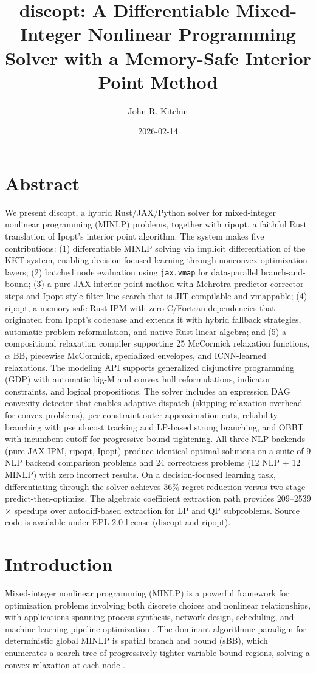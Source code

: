 \documentclass[12pt,preprint]{article}
\title{discopt: A Differentiable Mixed-Integer Nonlinear Programming Solver with a Memory-Safe Interior Point Method}
\author{John R. Kitchin}
\date{2026-02-14}
\begin{document}
\maketitle

\section{Abstract}
\label{org-abstract}
We present discopt, a hybrid Rust/JAX/Python solver for mixed-integer nonlinear programming (MINLP) problems, together with ripopt, a faithful Rust translation of Ipopt's interior point algorithm. The system makes five contributions: (1) differentiable MINLP solving via implicit differentiation of the KKT system, enabling decision-focused learning through nonconvex optimization layers; (2) batched node evaluation using \texttt{jax.vmap} for data-parallel branch-and-bound; (3) a pure-JAX interior point method with Mehrotra predictor-corrector steps and Ipopt-style filter line search that is JIT-compilable and vmappable; (4) ripopt, a memory-safe Rust IPM with zero C/Fortran dependencies that originated from Ipopt's codebase and extends it with hybrid fallback strategies, automatic problem reformulation, and native Rust linear algebra; and (5) a compositional relaxation compiler supporting 25 McCormick relaxation functions, $\alpha$ BB, piecewise McCormick, specialized envelopes, and ICNN-learned relaxations. The modeling API supports generalized disjunctive programming (GDP) with automatic big-M and convex hull reformulations, indicator constraints, and logical propositions. The solver includes an expression DAG convexity detector that enables adaptive dispatch (skipping relaxation overhead for convex problems), per-constraint outer approximation cuts, reliability branching with pseudocost tracking and LP-based strong branching, and OBBT with incumbent cutoff for progressive bound tightening. All three NLP backends (pure-JAX IPM, ripopt, Ipopt) produce identical optimal solutions on a suite of 9 NLP backend comparison problems and 24 correctness problems (12 NLP + 12 MINLP) with zero incorrect results. On a decision-focused learning task, differentiating through the solver achieves 36\% regret reduction versus two-stage predict-then-optimize. The algebraic coefficient extraction path provides 209--2539$\times$ speedups over autodiff-based extraction for LP and QP subproblems. Source code is available under EPL-2.0 license (discopt and ripopt).


\section{Introduction}
\label{org-introduction}
Mixed-integer nonlinear programming (MINLP) is a powerful framework for optimization problems involving both discrete choices and nonlinear relationships, with applications spanning process synthesis, network design, scheduling, and machine learning pipeline optimization \cite{Belotti2013,Grossmann2021}. The dominant algorithmic paradigm for deterministic global MINLP is spatial branch and bound (sBB), which enumerates a search tree of progressively tighter variable-bound regions, solving a convex relaxation at each node \cite{Land1960,Dakin1965,Smith1999}.
\end{document}

